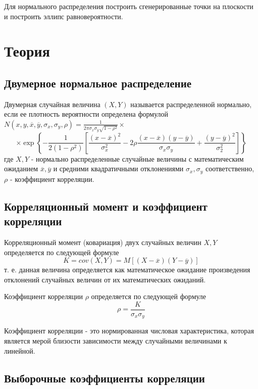 \documentclass{article}
\begin{document}
Для нормального распределения построить сгенерированные точки на плоскости и построить эллипс равновероятности.

\newpage
\section{Теория}

\subsection{Двумерное нормальное распределение}

Двумерная случайная величина $(X,Y)$ называется распределенной нормально, если ее плотность вероятности определена формулой \\


$
N(x,y,\overline{x}, \overline{y}, \sigma_x, \sigma_y, \rho) = \frac{1}{2\pi\sigma_x\sigma_y\sqrt{1-\rho^2}} \times $
\begin{equation}
\times \exp \left\{ -\frac{1}{2(1-\rho^2)} \left[ \frac{(x-\overline{x})^2}{\sigma_x^2} - 2\rho\frac{(x-\overline{x})(y-\overline{y})}{\sigma_x\sigma_y} + \frac{(y-\overline{y})^2}{\sigma_2^2} \right] \right\}
\label{eq:2}
\end{equation}
где $X,Y$ - нормально распределенные случайные величины с математическим ожиданием $\overline{x}, \overline{y}$ и средними квадратичными отклонениями $\sigma_x, \sigma_y$ соответственно, $\rho$ - коэффициент корреляции.

\subsection{Корреляционный момент и коэффициент корреляции}

Корреляционный момент (ковариация) двух случайных величин $X, Y$ определяется по следующей формуле
$$
K = cov(X,Y) = M[(X - \overline{x})(Y - \overline{y})]
$$ 
т. е. данная величина определяется как математическое ожидание произведения отклонений случайных величин от их математических ожиданий.

Коэффициент корреляции $\rho$ определяется по следующей формуле
$$
\rho = \frac{K}{\sigma_x\sigma_y}
$$
 
Коэффициент корреляции - это нормированная числовая характеристика, которая является мерой близости зависимости между случайными величинами к линейной.

\subsection{Выборочные коэффициенты корреляции}
\end{document}
